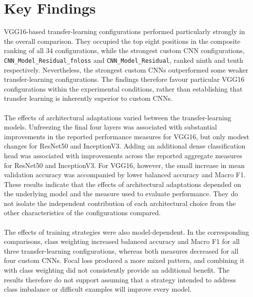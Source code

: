 \documentclass[12pt, a4paper]{report}
\let\oldsection\section
\renewcommand{\section}{%
    \Needspace{6\baselineskip}%
    \oldsection
}
\begin{document}
			
		\section{Key Findings}
			
			VGG16-based transfer-learning configurations performed particularly strongly in the overall comparison. They occupied the top eight positions in the composite ranking of all $34$ configurations, while the strongest custom CNN configurations, \texttt{CNN\_Model\_Residual\_fnloss} and \texttt{CNN\_Model\_Residual}, ranked ninth and tenth respectively. Nevertheless, the strongest custom CNNs outperformed some weaker transfer-learning configurations. The findings therefore favour particular VGG16 configurations within the experimental conditions, rather than establishing that transfer learning is inherently superior to custom CNNs.\\\\
			The effects of architectural adaptations varied between the transfer-learning models. Unfreezing the final four layers was associated with substantial improvements in the reported performance measures for VGG16, but only modest changes for ResNet50 and InceptionV3. Adding an additional dense classification head was associated with improvements across the reported aggregate measures for ResNet50 and InceptionV3. For VGG16, however, the small increase in mean validation accuracy was accompanied by lower balanced accuracy and Macro F1. These results indicate that the effects of architectural adaptations depended on the underlying model and the measure used to evaluate performance. They do not isolate the independent contribution of each architectural choice from the other characteristics of the configurations compared.\\\\
			The effects of training strategies were also model-dependent. In the corresponding comparisons, class weighting increased balanced accuracy and Macro F1 for all three transfer-learning configurations, whereas both measures decreased for all four custom CNNs. Focal loss produced a more mixed pattern, and combining it with class weighting did not consistently provide an additional benefit. The results therefore do not support assuming that a strategy intended to address class imbalance or difficult examples will improve every model.\\\\
\end{document}
